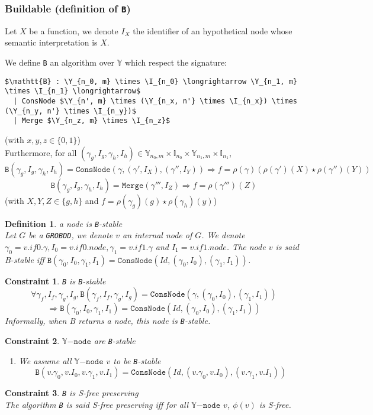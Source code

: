 \documentclass[a4paper,10pt]{article}
\newcommand{\Y}{\mathbb{Y}}
\newcommand{\I}{\mathbb{I}}
\newcommand{\Ynode}{\Y\mathtt{-node}}
\newcommand{\GroBdd}{\texttt{GROBDD}}
\newtheorem{newdef}{Definition}
\newcommand{\definition}[2]{\begin{newdef}{#1\\}#2\end{newdef}}
\newtheorem{newcons}{Constraint}
\newcommand{\constraint}[2]{\begin{newcons}{#1\\}#2\end{newcons}}
\begin{document}
\subsubsection{Buildable (definition of \texttt{B})}

Let $X$ be a function, we denote $I_X$ the identifier of an hypothetical node whose semantic interpretation is $X$.

We define \texttt{B} an algorithm over $\Y$ which respect the signature:
\begin{lstlisting}
$\mathtt{B} : \Y_{n_0, m} \times \I_{n_0} \longrightarrow \Y_{n_1, m} \times \I_{n_1} \longrightarrow$
  | ConsNode $\Y_{n', m} \times (\Y_{n_x, n'} \times \I_{n_x}) \times (\Y_{n_y, n'} \times \I_{n_y})$
  | Merge $\Y_{n_z, m} \times \I_{n_z}$
\end{lstlisting}
(with $x, y, z \in \{0, 1\}$) \\
Furthermore, for all $(\gamma_g, I_g, \gamma_h, I_h) \in \Y_{n_0, m} \times \I_{n_0} \times \Y_{n_1, m} \times \I_{n_1}$, 
\[ \texttt{B}(\gamma_g, I_g, \gamma_h, I_h) = \texttt{ConsNode} (\gamma, (\gamma', I_X), (\gamma'', I_Y)) \Rightarrow f = \rho\left(\gamma\right) \left(\rho\left(\gamma'\right)(X) \star \rho\left(\gamma''\right)(Y)\right)\]
\[ \texttt{B}(\gamma_g, I_g, \gamma_h, I_h) = \texttt{Merge} (\gamma''', I_Z) \Rightarrow f = \rho(\gamma''')(Z) \]
(with $X, Y, Z \in\{g, h\}$ and $f = \rho(\gamma_g)(g) \star \rho(\gamma_h)(y)$)

\definition{a node is \texttt{B}-stable}
{Let $G$ be a \GroBdd{}, we denote $v$ an internal node of $G$.
We denote $\gamma_0 = v.if0.\gamma, I_0 = v.if0.node, \gamma_1 = v.if1.\gamma$ and $I_1 = v.if1.node$.
The node $v$ is said B-stable iff $\mathtt{B}(\gamma_0, I_0, \gamma_1, I_1) = \mathtt{ConsNode}(Id, (\gamma_0, I_0), (\gamma_1, I_1))$.
}

\constraint{\texttt{B} is \texttt{B}-stable}
{\[\forall \gamma_f, I_f, \gamma_g, I_g, \mathtt{B}(\gamma_f, I_f, \gamma_g, I_g) = \mathtt{ConsNode}(\gamma, (\gamma_0, I_0), (\gamma_1, I_1))\]
\[\Rightarrow \mathtt{B}(\gamma_0, I_0, \gamma_1, I_1) = \mathtt{ConsNode}(Id, (\gamma_0, I_0), (\gamma_1, I_1))\]
Informally, when B returns a node, this node is \texttt{B}-stable.
}

\constraint{$\Ynode$ are \texttt{B}-stable}
{\begin{enumerate}
\item We assume all $\Ynode$ $v$ to be \texttt{B}-stable
\[\mathtt{B}(v.\gamma_0, v.I_0, v.\gamma_1, v.I_1) = \mathtt{ConsNode}(Id, (v.\gamma_0, v.I_0), (v.\gamma_1, v.I_1))\]
\end{enumerate}
}
\constraint{\texttt{B} is S-free preserving}
{The algorithm \texttt{B} is said S-free preserving iff for all $\Ynode$ $v$, $\phi(v)$ is S-free.}
\end{document}
